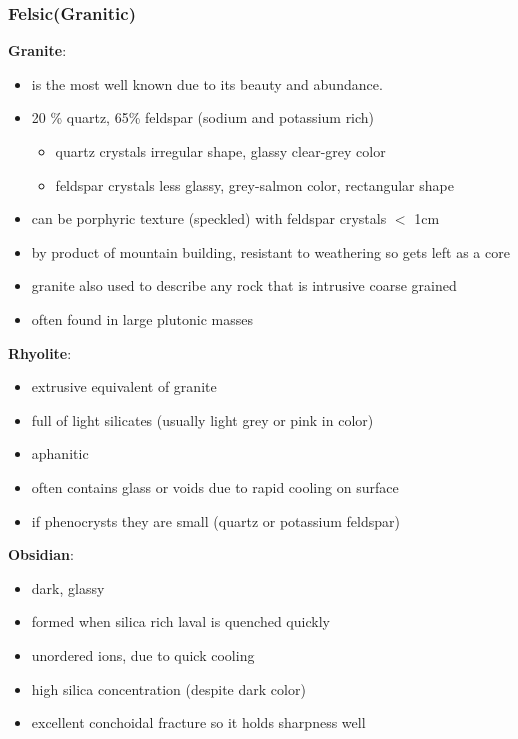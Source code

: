 \documentclass{article}
\begin{document}
\subsubsection*{Felsic(Granitic)} %
\label{subsub:felsic}

\textbf{Granite}:
\begin{itemize}
    \item is the most well known due to its beauty and abundance.
    \item 20 \% quartz, 65\% feldspar (sodium and potassium rich)
    \begin{itemize}
        \item quartz crystals irregular shape, glassy clear-grey color
        \item feldspar crystals less glassy, grey-salmon color, rectangular shape
    \end{itemize}
    \item can be porphyric texture (speckled) with feldspar crystals $<$ 1cm
    \item by product of mountain building, resistant to weathering so gets left as a core
    \item granite also used to describe any rock that is intrusive coarse grained
    \item often found in large plutonic masses
\end{itemize}

\textbf{Rhyolite}:
\begin{itemize}
    \item extrusive equivalent of granite
    \item full of light silicates (usually light grey or pink in color)
    \item aphanitic
    \item often contains glass or voids due to rapid cooling on surface
    \item if phenocrysts they are small (quartz or potassium feldspar)
\end{itemize}

\textbf{Obsidian}:
\begin{itemize}
    \item dark, glassy
    \item formed when silica rich laval is quenched quickly
    \item unordered ions, due to quick cooling
    \item high silica concentration (despite dark color)
    \item excellent conchoidal fracture so it holds sharpness well
\end{itemize}
\end{document}
